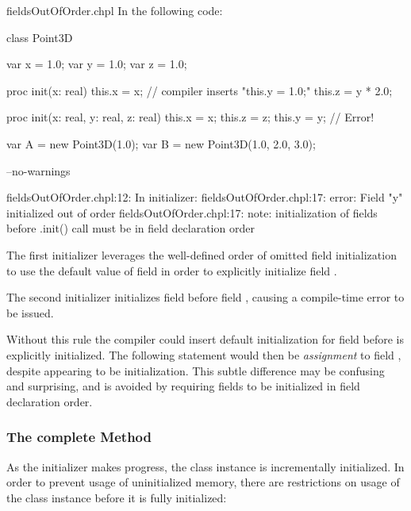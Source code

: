\begin{chapelexample}{fieldsOutOfOrder.chpl}
In the following code:
\begin{chapel}
class Point3D {
  var x = 1.0;
  var y = 1.0;
  var z = 1.0;

  proc init(x: real) {
    this.x = x;
    // compiler inserts "this.y = 1.0;"
    this.z = y * 2.0;
  }

  proc init(x: real, y: real, z: real) {
    this.x = x;
    this.z = z;
    this.y = y; // Error!
  }
}

var A = new Point3D(1.0);
var B = new Point3D(1.0, 2.0, 3.0);
\end{chapel}
\begin{chapelcompopts}
--no-warnings
\end{chapelcompopts}
\begin{chapeloutput}
fieldsOutOfOrder.chpl:12: In initializer:
fieldsOutOfOrder.chpl:17: error: Field "y" initialized out of order
fieldsOutOfOrder.chpl:17: note: initialization of fields before .init() call must be in field declaration order
\end{chapeloutput}

The first initializer leverages the well-defined order of omitted field
initialization to use the default value of field  in order to
explicitly initialize field .

The second initializer initializes field  before field ,
causing a compile-time error to be issued.

\end{chapelexample}

\begin{rationale}
Without this rule the compiler could insert default initialization for field
 before  is explicitly initialized. The following statement
would then be {\em assignment} to field , despite appearing to be
initialization. This subtle difference may be confusing and surprising, and
is avoided by requiring fields to be initialized in field declaration order.
\end{rationale}

\subsubsection{The complete Method}
\label{The_Complete_Method}

As the initializer makes progress, the class instance is incrementally
initialized. In order to prevent usage of uninitialized memory, there are
restrictions on usage of the class instance before it is fully initialized:

